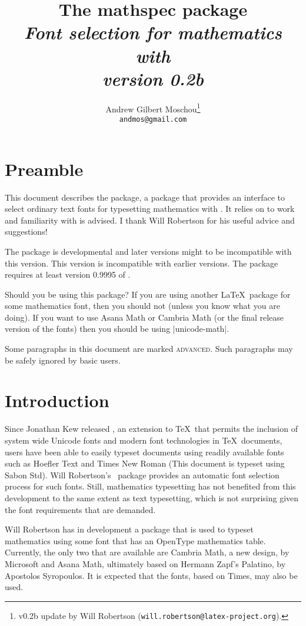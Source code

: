 \documentclass{ltxdockit}
\title{The \textsf{\spotcolor mathspec} package\\[0.25em]\mdseries\itshape\normalsize Font selection for mathematics with \XeLaTeX\\[1ex]\mdseries\upshape version 0.2b}
\author{Andrew Gilbert Moschou\thanks{v0.2b update by Will Robertson (\texttt{will.robertson@latex-project.org}).}\\\texttt{andmos@gmail.com}
}
\begin{document}
\maketitle

\tableofcontents

\section{Preamble}

This document describes the  package, a package that provides an interface to select ordinary text fonts for typesetting mathematics with \XeLaTeX. It relies on  to work and familiarity with  is advised. I thank Will Robertson for his useful advice and suggestions!

The package is developmental and later versions might to be incompatible with this version. This version is incompatible with earlier versions. The package requires at least version 0.9995 of \XeTeX.

Should you be using this package? If you are using another \LaTeX\ package for some mathematics font, then you should not (unless you know what you are doing). If you want to use Asana Math or Cambria Math (or the final release version of the  fonts) then you should be using |unicode-math|.

Some paragraphs in this document are marked \textsc{\spotcolor advanced}. Such paragraphs may be safely ignored by basic users.

\section{Introduction}

Since Jonathan Kew released \XeTeX, an extension to \TeX\ that permits the inclusion of system wide Unicode fonts and modern font technologies in \TeX\ documents, users have been able to easily typeset documents using readily available fonts such as Hoefler Text and Times New Roman (This document is typeset using Sabon  Std). Will Robertson’s \XeLaTeX\ package  provides an automatic font selection process for such fonts. Still, mathematics typesetting has not benefited from this development to the same extent as text typesetting, which is not surprising given the font requirements that are demanded.

Will Robertson has in development a package  that is used to typeset mathematics using some font that has an OpenType mathematics table. Currently, the only two that are available are Cambria Math, a new design, by Microsoft and Asana Math, ultimately based on Hermann Zapf’s Palatino, by Apostolos Syropoulos. It is expected that the  fonts, based on Times, may also be used.
\end{document}
